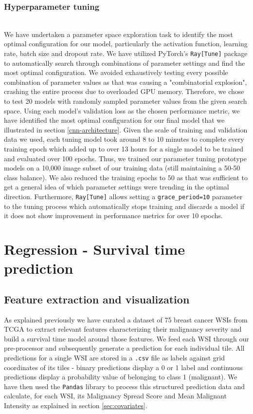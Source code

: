 \documentclass{l4proj}
\begin{document}
\subsubsection{Hyperparameter tuning}\hfill\\
We have undertaken a parameter space exploration task to identify the most optimal configuration for our model, particularly the activation function, learning rate, batch size and dropout rate. We have utilized PyTorch's \texttt{Ray[Tune]} package to automatically search through combinations of parameter settings and find the most optimal configuration. We avoided exhaustively testing every possible combination of parameter values as that was causing a "combinatorial explosion", crashing the entire process due to overloaded GPU memory. Therefore, we chose to test 20 models with randomly sampled parameter values from the given search space. Using each model's validation loss as the chosen performance metric, we have identified the most optimal configuration  for our final model that we illustrated in section \ref{cnn-architecture}. Given the scale of training and validation data we used, each tuning model took around 8 to 10 minutes to complete every training epoch which added up to over 13 hours for a single model to be trained and evaluated over 100 epochs. Thus, we trained our parameter tuning prototype models on a 10,000 image subset of our training data (still maintaining a 50-50 class balance). We also reduced the training epochs to 50 as that was sufficient to get a general idea of which parameter settings were trending in the optimal direction. Furthermore, \texttt{Ray[Tune]} allows setting a \texttt{grace\_period=10} parameter to the tuning process which automatically stops training and discards a model if it does not show improvement in performance metrics for over 10 epochs.
 

\section{Regression - Survival time prediction}
\subsection{Feature extraction and visualization}
As explained previously we have curated a dataset of 75 breast cancer WSIs from TCGA to extract relevant features characterizing their malignancy severity and build a survival time model around those features. We feed each WSI through our pre-processor and subsequently generate a prediction for each individual tile. All predictions for a single WSI are stored in a \texttt{.csv} file as labels against  grid coordinates of its tiles - binary predictions display a 0 or 1 label and continuous predictions display a probability value of belonging to class 1 (malignant). We have then used the \texttt{Pandas} library to process this structured prediction data and calculate, for each WSI, its Malignancy Spread Score and Mean Malignant Intensity as explained in section \ref{sec:covariates}. 
\end{document}
